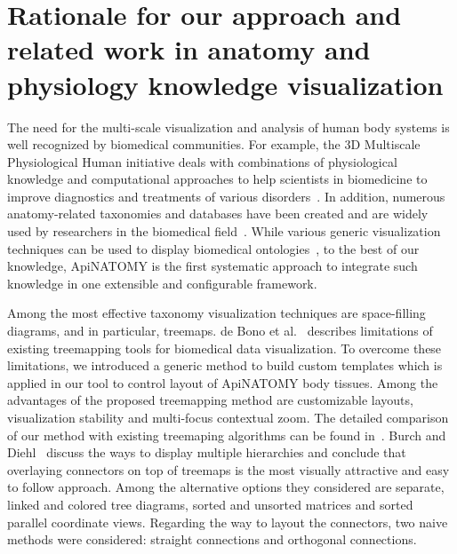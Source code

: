 \section{Rationale for our approach and related work in anatomy and physiology knowledge visualization}
\label{sect:relatedWork}

The need for the multi-scale visualization and analysis of human body systems is well recognized by
biomedical communities. For example, the 3D Multiscale Physiological Human initiative deals with
combinations of physiological knowledge and computational approaches to help scientists in
biomedicine to improve diagnostics and treatments of various disorders~\cite{MRC09,Mag09}. In
addition, numerous anatomy-related taxonomies and databases have been created and are widely used by
researchers in the biomedical field~\cite{BDB08}. While various generic visualization techniques can
be used to display biomedical ontologies~\cite{KHL+07}, to the best of our knowledge, ApiNATOMY is
the first systematic approach to integrate such knowledge in one extensible and configurable
framework.

Among the most effective taxonomy visualization techniques are space-filling diagrams, and in
particular, treemaps. de Bono et al.~\cite{BGS12} describes limitations of existing treemapping
tools for biomedical data visualization. To overcome these limitations, we introduced a generic
method to build custom templates which is applied in our tool to control layout of ApiNATOMY body
tissues. Among the advantages of the proposed treemapping method are customizable layouts,
visualization stability and multi-focus contextual zoom. The detailed comparison of our method with
existing treemaping algorithms can be found in~\cite{KBK14}.
Burch and Diehl~\cite{BD06} discuss the ways to display multiple hierarchies and conclude that
overlaying connectors on top of treemaps is the most visually attractive and easy to follow
approach. Among the alternative options they considered are separate, linked and colored tree
diagrams, sorted and unsorted matrices and sorted parallel coordinate views. Regarding the way to
layout the connectors, two naive methods were considered: straight connections and orthogonal
connections. %

